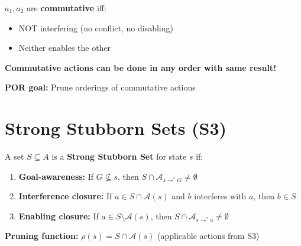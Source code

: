 \documentclass[11pt,a4paper]{article}
\begin{document}
\begin{definitionbox}
$a_1, a_2$ are \textbf{commutative} iff:
\begin{itemize}[leftmargin=*,nosep]
\item NOT interfering (no conflict, no disabling)
\item Neither enables the other
\end{itemize}

\textbf{Commutative actions can be done in any order with same result!}

\textbf{POR goal:} Prune orderings of commutative actions
\end{definitionbox}

\section{Strong Stubborn Sets (S3)}

\begin{definitionbox}
A set $S \subseteq A$ is a \textbf{Strong Stubborn Set} for state $s$ if:
\begin{enumerate}[leftmargin=*,nosep]
\item \textbf{Goal-awareness:} If $G \not\subseteq s$, then $S \cap \mathcal{A}_{s \to^* G} \neq \emptyset$
\item \textbf{Interference closure:} If $a \in S \cap \mathcal{A}(s)$ and $b$ interferes with $a$, then $b \in S$
\item \textbf{Enabling closure:} If $a \in S \setminus \mathcal{A}(s)$, then $S \cap \mathcal{A}_{s \to^* a} \neq \emptyset$
\end{enumerate}

\textbf{Pruning function:} $\rho(s) = S \cap \mathcal{A}(s)$ (applicable actions from S3)
\end{definitionbox}
\end{document}
